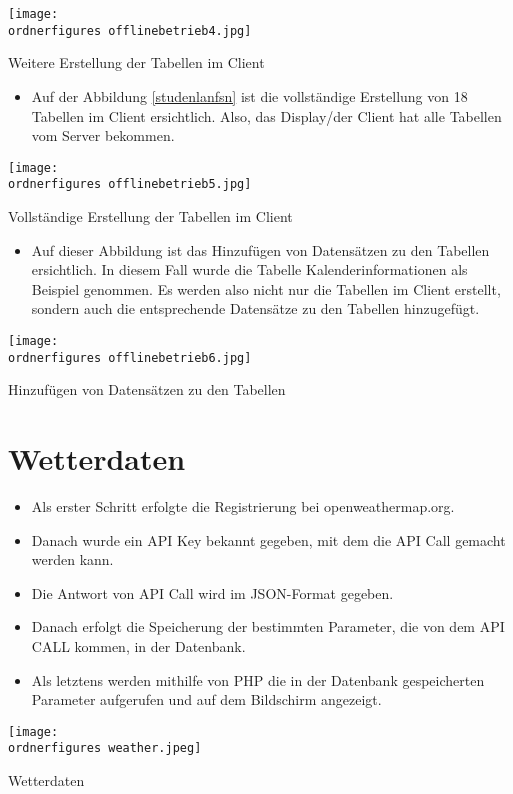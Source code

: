 \begin{center}
	\captionsetup{type=figure}
	\texttt{[image: \\ordnerfigures offlinebetrieb4.jpg]}
	\caption{Weitere Erstellung der Tabellen im Client}
	\label{studenplanfsn} 
\end{center}
\begin{itemize}
	\item Auf der Abbildung \ref{studenlanfsn} ist die vollst\"andige Erstellung von 18 Tabellen im Client ersichtlich. Also, das Display/der Client hat alle Tabellen vom Server bekommen.
\end{itemize}
\begin{center}
	\captionsetup{type=figure}
	\texttt{[image: \\ordnerfigures offlinebetrieb5.jpg]}
	\caption{Vollst\"andige Erstellung der Tabellen im Client}
	\label{studenlanfsn} 
\end{center}
\begin{itemize}
	\item Auf dieser Abbildung ist das Hinzuf\"ugen von Datens\"atzen zu den Tabellen ersichtlich. In diesem Fall wurde die Tabelle Kalenderinformationen als Beispiel genommen. Es werden also nicht nur die Tabellen im Client erstellt, sondern auch die entsprechende Datens\"atze zu den Tabellen hinzugef\"ugt.
\end{itemize}
\begin{center}
	\captionsetup{type=figure}
	\texttt{[image: \\ordnerfigures offlinebetrieb6.jpg]}
	\caption{Hinzuf\"ugen von Datens\"atzen zu den Tabellen}
	\label{stuenlanfsn} 
\end{center}
\section{Wetterdaten}
\begin{itemize}
	\item Als erster Schritt erfolgte die Registrierung bei openweathermap.org. 
\end{itemize}
\begin{itemize}
	\item 	Danach wurde ein API Key bekannt gegeben, mit dem die API Call gemacht werden kann.
\end{itemize}
\begin{itemize}
	\item Die Antwort von API Call wird im JSON-Format gegeben.
\end{itemize}
\begin{itemize}
	\item Danach erfolgt die Speicherung der bestimmten Parameter, die von dem API CALL kommen, in der Datenbank.
\end{itemize}
\begin{itemize}
	\item Als letztens werden mithilfe von PHP die in der Datenbank gespeicherten Parameter aufgerufen und auf dem Bildschirm angezeigt.
\end{itemize}
\begin{center}
	\captionsetup{type=figure}
	\texttt{[image: \\ordnerfigures weather.jpeg]}
	\caption{Wetterdaten}
	\label{Wetter} 
	\captionsetup{type=figure} 
\end{center}	
